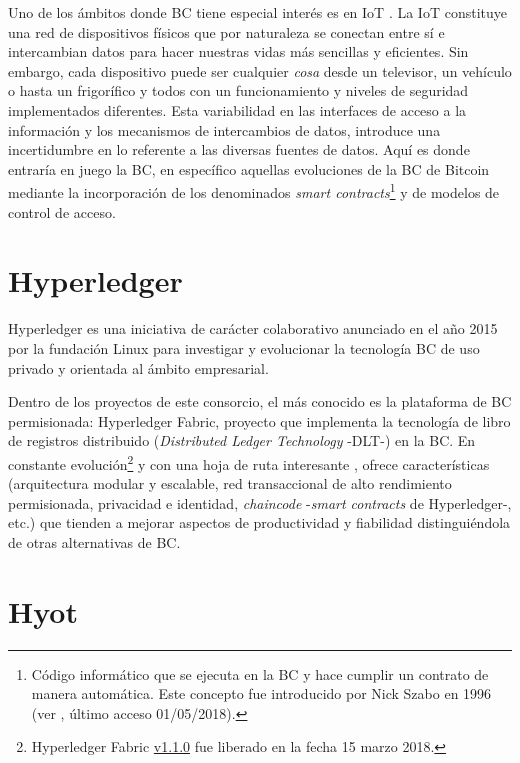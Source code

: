 \documentclass[10pt,conference,a4paper]{IEEEtran}
\begin{document}
Uno de los ámbitos donde BC tiene especial interés es en IoT \cite{dorri:2017:TOBI}. La IoT
constituye una red de dispositivos físicos que por naturaleza se
conectan entre sí e intercambian datos para hacer nuestras vidas más
sencillas y eficientes. Sin embargo, cada dispositivo puede ser
cualquier \textit{cosa} desde un televisor, un vehículo o hasta un frigorífico y todos con un funcionamiento y niveles de seguridad implementados diferentes. Esta variabilidad
en las interfaces de acceso a la información y los mecanismos de
intercambios de datos, introduce una incertidumbre en lo referente a
las diversas fuentes de datos. Aquí es donde entraría en juego la BC,
en específico aquellas evoluciones de la BC de Bitcoin mediante la
incorporación de los denominados \emph{smart
  contracts}\footnote{Código informático que se ejecuta en la
  BC y hace cumplir un contrato de manera automática. Este
  concepto fue introducido por Nick Szabo en 1996 (ver \cite{szabo:1997:FSRPN},
  último acceso 01/05/2018).} y
de modelos de control de acceso.

\section{Hyperledger}

Hyperledger es una iniciativa de carácter colaborativo anunciado en el año 2015 por la fundación Linux para investigar y evolucionar la tecnología BC de uso privado y orientada al ámbito empresarial.

Dentro de los proyectos de este consorcio, el más conocido es la plataforma de BC permisionada: Hyperledger Fabric, proyecto que implementa la tecnología de libro de registros distribuido (\textit{Distributed Ledger Technology} -DLT-) en la BC. En constante evolución\footnote{Hyperledger Fabric \href{https://github.com/hyperledger/fabric/releases/tag/v1.1.0}{v1.1.0} fue liberado en la fecha 15 marzo 2018.} y con una hoja de ruta interesante \cite{hyperledgerfabricroadmap:url}, ofrece características \cite{vukolic:2017:HF} (arquitectura modular y escalable, red transaccional de alto rendimiento permisionada, privacidad e identidad, \textit{chaincode} -\textit{smart contracts} de Hyperledger-, etc.) que tienden a mejorar aspectos de productividad y fiabilidad distinguiéndola de otras alternativas de BC.

\section{Hyot}
\end{document}
